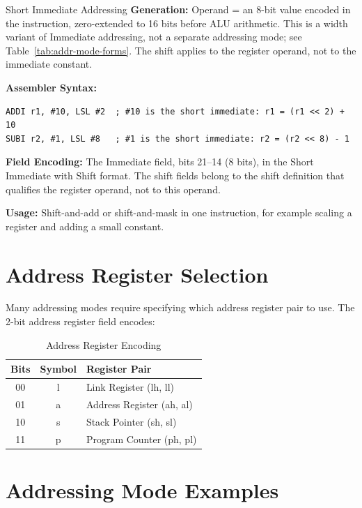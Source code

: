 \begin{addrmodebox}{Short Immediate Addressing}
	\textbf{Generation:} Operand = an 8-bit value encoded in the instruction, zero-extended to 16 bits before ALU
	arithmetic. This is a width variant of Immediate addressing, not a separate addressing mode; see
	Table~\ref{tab:addr-mode-forms}. The shift applies to the register operand, not to the immediate constant.

	\textbf{Assembler Syntax:}
	\begin{lstlisting}
ADDI r1, #10, LSL #2  ; #10 is the short immediate: r1 = (r1 << 2) + 10
SUBI r2, #1, LSL #8   ; #1 is the short immediate: r2 = (r2 << 8) - 1
	\end{lstlisting}

	\textbf{Field Encoding:} The Immediate field, bits 21--14 (8 bits), in the Short Immediate with Shift format. The shift fields belong to the shift definition that qualifies the register operand, not to this operand.

	\textbf{Usage:} Shift-and-add or shift-and-mask in one instruction, for example scaling a register and adding a small
	constant.
\end{addrmodebox}

\section{Address Register Selection}

Many addressing modes require specifying which address register pair to use. The 2-bit address register field encodes:

\begin{table}[H]
	\centering
	\begin{tabular}{ccl}
		\toprule
		\textbf{Bits} & \textbf{Symbol} & \textbf{Register Pair}    \\
		\midrule
		00            & l               & Link Register (lh, ll)    \\
		01            & a               & Address Register (ah, al) \\
		10            & s               & Stack Pointer (sh, sl)    \\
		11            & p               & Program Counter (ph, pl)  \\
		\bottomrule
	\end{tabular}
	\caption{Address Register Encoding}
	\label{tab:addr-reg-encoding}
\end{table}

\section{Addressing Mode Examples}

